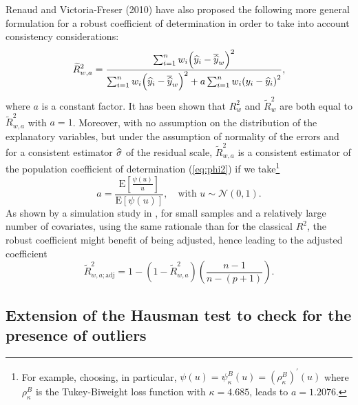 Renaud and Victoria-Freser (2010) have also proposed the following more
general formulation for a robust coefficient of determination in order to take
into account consistency considerations:
\begin{equation}
\widetilde{R}_{w,a}^{2}=\frac{\sum_{i=1}^{n}w_{i}\left(  \sthat{y}%
_{i}-\overline{\sthat{y}}_{w}\right)  ^{2}}{\sum_{i=1}^{n}w_{i}\left(
\sthat{y}_{i}-\overline{\sthat{y}}_{w}\right)  ^{2}+a\sum_{i=1}^{n}%
w_{i}\left(  y_{i}-\sthat{y}_{i}\right)  ^{2}}, \label{eq:Rtilde2_w_a}%
\end{equation}
where $a$ is a constant factor. It has been shown that $R_{w}^{2}$ and
$\widetilde{R}_{w}^{2}$ are both equal to $\widetilde{R}_{w,a}^{2}$ with
$a=1$. Moreover, with no assumption on the distribution of the explanatory
variables, but under the assumption of normality of the errors and for a
consistent estimator $\widehat{\sigma}$ of the residual scale, $\widetilde
{R}_{w,a}^{2}$ is a consistent estimator of the population coefficient of
determination (\ref{eq:phi2}) if we take\footnote{For example, choosing, in
particular, $\psi\left(  u\right)  =\psi_{\kappa}^{B}\left(  u\right)
=\left(  \rho_{\kappa}^{B}\right)  ^{\prime}\left(  u\right)  $ where
$\rho_{\kappa}^{B}$ is the Tukey-Biweight loss function with $\kappa=4.685$,
leads to $a=1.2076$.}
\[
a=\frac{\mathrm{E}\left[  \frac{\psi\left(  u\right)  }{u}\right]
}{\mathrm{E}\left[  \psi\left(  u\right)  \right]  },\quad\text{with }%
u\sim\mathcal{N}\left(  0,1\right)  .
\]
As shown by a simulation study in \citet{Renaud:2010}, for
small samples and a relatively large number of covariates, using the same
rationale than for the classical $R^{2}$, the robust coefficient might benefit
of being adjusted, hence leading to the adjusted coefficient
\begin{equation}
\widetilde{R}_{w,a;\mathrm{adj}}^{2}=1-\left(  1-\widetilde{R}_{w,a}%
^{2}\right)  \left(  \frac{n-1}{n-\left(  p+1\right)  }\right)  .
\label{eq:Rtilde2_w_a_adj}%
\end{equation}


\subsection{Extension of the Hausman test to check for the presence of
outliers\label{subsec:Hausman}}

